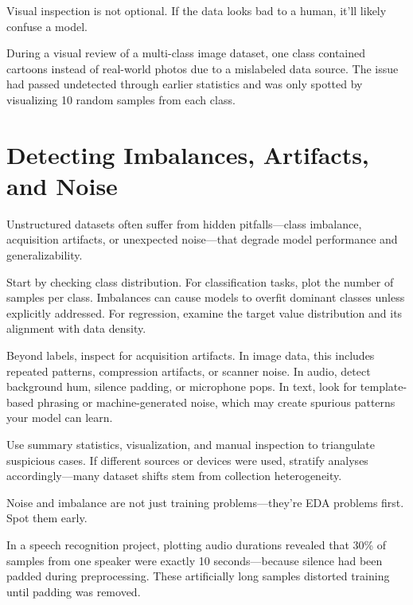 \documentclass[12pt,openany, draft]{book}
\begin{document}
Visual inspection is not optional. If the data looks bad to a human, it’ll likely confuse a model.

\begin{examplebox}
During a visual review of a multi-class image dataset, one class contained cartoons instead of real-world photos due to a mislabeled data source. The issue had passed undetected through earlier statistics and was only spotted by visualizing 10 random samples from each class.
\end{examplebox}



\section{Detecting Imbalances, Artifacts, and Noise}

Unstructured datasets often suffer from hidden pitfalls—class imbalance, acquisition artifacts, or unexpected noise—that degrade model performance and generalizability.
\newline

Start by checking class distribution. For classification tasks, plot the number of samples per class. Imbalances can cause models to overfit dominant classes unless explicitly addressed. For regression, examine the target value distribution and its alignment with data density.
\newline

Beyond labels, inspect for acquisition artifacts. In image data, this includes repeated patterns, compression artifacts, or scanner noise. In audio, detect background hum, silence padding, or microphone pops. In text, look for template-based phrasing or machine-generated noise, which may create spurious patterns your model can learn.
\newline

Use summary statistics, visualization, and manual inspection to triangulate suspicious cases. If different sources or devices were used, stratify analyses accordingly—many dataset shifts stem from collection heterogeneity.
\newline

Noise and imbalance are not just training problems—they're EDA problems first. Spot them early.

\begin{examplebox}
In a speech recognition project, plotting audio durations revealed that 30\% of samples from one speaker were exactly 10 seconds—because silence had been padded during preprocessing. These artificially long samples distorted training until padding was removed.
\end{examplebox}
\end{document}
